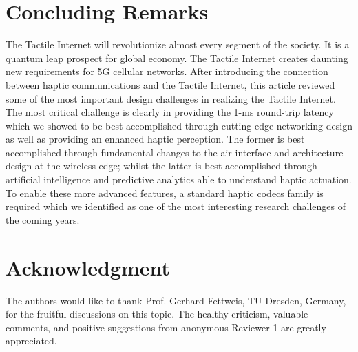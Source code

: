 \documentclass[journal]{IEEEtran}
\begin{document}
\section{Concluding Remarks}
The Tactile Internet will revolutionize almost every segment of the society. It is a quantum leap prospect for global economy. The Tactile Internet creates daunting new requirements for 5G cellular networks. After introducing the connection between haptic communications and the Tactile Internet, this article  reviewed some of the most important design challenges in realizing the Tactile Internet. The most critical challenge is clearly in providing the 1-ms round-trip latency which we showed to be best accomplished through cutting-edge networking design as well as providing an enhanced haptic perception. The former is best accomplished through fundamental changes to the air interface and architecture design at the wireless edge; whilst the latter is best accomplished through artificial intelligence and predictive analytics able to understand haptic actuation. To enable these more advanced features, a standard haptic codecs family is required which we identified as one of the most interesting research challenges of the coming years.














\section*{Acknowledgment}
The authors would like to thank Prof. Gerhard Fettweis, TU Dresden, Germany, for the fruitful discussions on this topic. The healthy criticism, valuable comments, and positive suggestions from anonymous Reviewer 1 are greatly appreciated. 









\end{document}
